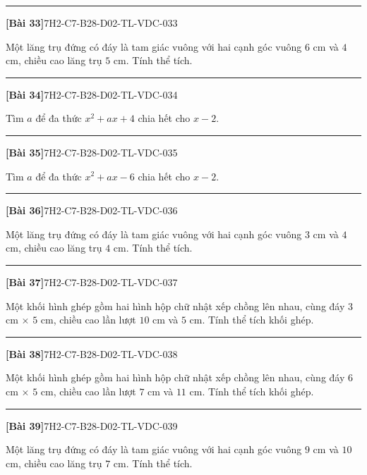 \documentclass[12pt,a4paper]{article}
\newif\ifloigiai
\newenvironment{cauhoi}[2]{%
  \par\medskip\noindent\rule{\textwidth}{0.4pt}\par\nopagebreak
  \noindent\textbf{[#1]}\hfill{\scriptsize\ttfamily #2}\par\nopagebreak\smallskip}{\par}
\newcommand{\loigiai}[1]{\ifloigiai\par\smallskip\noindent\textit{Lời giải.} #1\par\fi}
\begin{document}
\begin{cauhoi}{Bài 33}{7H2-C7-B28-D02-TL-VDC-033}
Một lăng trụ đứng có đáy là tam giác vuông với hai cạnh góc vuông $6$ cm và $4$ cm, chiều cao lăng trụ $5$ cm. Tính thể tích.
\loigiai{Diện tích đáy là $\dfrac{6\cdot 4}{2}=12$ ($\text{cm}^2$). Thể tích là $12\cdot 5=60$ ($\text{cm}^3$).}
\end{cauhoi}
\begin{cauhoi}{Bài 34}{7H2-C7-B28-D02-TL-VDC-034}
Tìm $a$ để đa thức $x^{2}+ax+4$ chia hết cho $x-2$.
\loigiai{Đa thức chia hết cho $x-2$ khi $x=2$ là nghiệm: $4+2a+4=0$, suy ra $a=-4$.}
\end{cauhoi}
\begin{cauhoi}{Bài 35}{7H2-C7-B28-D02-TL-VDC-035}
Tìm $a$ để đa thức $x^{2}+ax-6$ chia hết cho $x-2$.
\loigiai{Đa thức chia hết cho $x-2$ khi $x=2$ là nghiệm: $4+2a-6=0$, suy ra $a=1$.}
\end{cauhoi}
\begin{cauhoi}{Bài 36}{7H2-C7-B28-D02-TL-VDC-036}
Một lăng trụ đứng có đáy là tam giác vuông với hai cạnh góc vuông $3$ cm và $4$ cm, chiều cao lăng trụ $4$ cm. Tính thể tích.
\loigiai{Diện tích đáy là $\dfrac{3\cdot 4}{2}=6$ ($\text{cm}^2$). Thể tích là $6\cdot 4=24$ ($\text{cm}^3$).}
\end{cauhoi}
\begin{cauhoi}{Bài 37}{7H2-C7-B28-D02-TL-VDC-037}
Một khối hình ghép gồm hai hình hộp chữ nhật xếp chồng lên nhau, cùng đáy $3$ cm $\times$ $5$ cm, chiều cao lần lượt $10$ cm và $5$ cm. Tính thể tích khối ghép.
\loigiai{Thể tích hai khối là $3\cdot 5\cdot 10=150$ và $3\cdot 5\cdot 5=75$ ($\text{cm}^3$). Thể tích khối ghép là $150+75=225$ ($\text{cm}^3$).}
\end{cauhoi}
\begin{cauhoi}{Bài 38}{7H2-C7-B28-D02-TL-VDC-038}
Một khối hình ghép gồm hai hình hộp chữ nhật xếp chồng lên nhau, cùng đáy $6$ cm $\times$ $5$ cm, chiều cao lần lượt $7$ cm và $11$ cm. Tính thể tích khối ghép.
\loigiai{Thể tích hai khối là $6\cdot 5\cdot 7=210$ và $6\cdot 5\cdot 11=330$ ($\text{cm}^3$). Thể tích khối ghép là $210+330=540$ ($\text{cm}^3$).}
\end{cauhoi}
\begin{cauhoi}{Bài 39}{7H2-C7-B28-D02-TL-VDC-039}
Một lăng trụ đứng có đáy là tam giác vuông với hai cạnh góc vuông $9$ cm và $10$ cm, chiều cao lăng trụ $7$ cm. Tính thể tích.
\loigiai{Diện tích đáy là $\dfrac{9\cdot 10}{2}=45$ ($\text{cm}^2$). Thể tích là $45\cdot 7=315$ ($\text{cm}^3$).}
\end{cauhoi}
\end{document}
